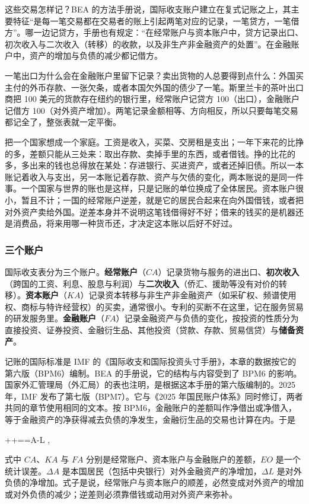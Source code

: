 这些交易怎样记？BEA 的方法手册说，国际收支账户建立在复式记账之上，其主要特征“是每一笔交易都在交易者的账上引起两笔对应的记录，一笔贷方，一笔借方”\cite{bea2026iea}。哪一边记贷方，手册也有规定：“在经常账户与资本账户中，贷方记录出口、初次收入与二次收入（转移）的收款，以及非生产非金融资产的处置”。在金融账户中，资产的增加与负债的减少都记借方\cite{bea2026iea}。

一笔出口为什么会在金融账户里留下记录？卖出货物的人总要得到点什么：外国买主付的外币存款、一张欠条，或者本国欠外国的债少了一笔。斯里兰卡的茶叶出口商把 100 美元的货款存在纽约的银行里，经常账户记贷方 100（出口），金融账户记借方 100（对外资产增加）。两笔记录金额相等、方向相反，所以只要每笔交易都记全了，整张表就一定平衡。

\begin{intuition}[一个家庭的两本账]
把一个国家想成一个家庭。工资是收入，买菜、交房租是支出；一年下来花的比挣的多，差额只能从三处来：取出存款、卖掉手里的东西，或者借钱。挣的比花的多，多出来的钱也总得放在某处：存进银行、买进资产，或者还掉旧债。所以一本账记着收入与支出，另一本账记着存款、资产与欠债的变化，两本账说的是同一件事。一个国家与世界的账也是这样，只是记账的单位换成了全体居民。资本账户很小，暂且不计；一国的经常账户逆差，就是它的居民合起来在向外国借钱，或者把对外资产卖给外国。逆差本身并不说明这笔钱借得好不好；借来的钱买的是机器还是消费品，将来用哪一种货币还，才决定这本账以后好不好过。
\end{intuition}

\subsubsection{三个账户}
国际收支表分为三个账户。\textbf{经常账户}（$\mathit{CA}$）记录货物与服务的进出口、\textbf{初次收入}（跨国的工资、利息、股息与利润）与\textbf{二次收入}（侨汇、援助等没有对价的转移）。\textbf{资本账户}（$\mathit{KA}$）记录资本转移与非生产非金融资产（如采矿权、频谱使用权、商标与特许经营权）的买卖，通常很小。专利的买断不在这里，记在服务贸易的研发服务里\cite{bea2026iea}。\textbf{金融账户}（$\mathit{FA}$）记录金融资产与负债的变化，按投资的性质分为直接投资、证券投资、金融衍生品、其他投资（贷款、存款、贸易信贷）与\textbf{储备资产}。

记账的国际标准是 IMF 的《国际收支和国际投资头寸手册》，本章的数据按它的第六版（BPM6）编制。BEA 的手册说，它的结构与内容受到了 BPM6 的影响\cite{bea2026iea}。国家外汇管理局（外汇局）的表也注明，是根据这本手册的第六版编制的\cite{safe2017}。2025 年，IMF 发布了第七版（BPM7）。它与《2025 年国民账户体系》同时修订，两者共同的章节使用相同的文本\cite{sna2025}。按 BPM6，金融账户的差额叫作净借出或净借入，等于金融资产的净获得减去负债的净发生，金融衍生品的交易也计算在内\cite{bea2026iea}。于是
\begin{keyeq}
++==\Delta A-\Delta L ,\label{eq:external-bop}
\end{keyeq}
式中 $\mathit{CA}$、$\mathit{KA}$ 与 $\mathit{FA}$ 分别是经常账户、资本账户与金融账户的差额，$\mathit{EO}$ 是一个统计误差。$\Delta A$ 是本国居民（包括中央银行）对外金融资产的净增加，$\Delta L$ 是对外负债的净增加。式子是说，经常账户与资本账户的顺差，必然变成对外资产的增加或对外负债的减少；逆差则必须靠借钱或动用对外资产来弥补。

